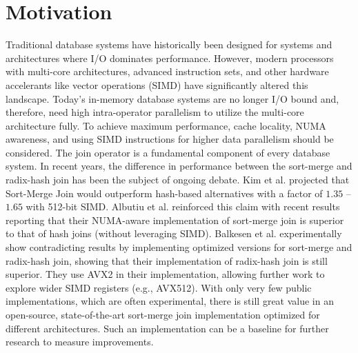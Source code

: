 \section{Motivation}
\label{sec:motivation}

Traditional database systems have historically been designed for systems and architectures where
I/O dominates performance. However, modern processors with multi-core architectures, advanced 
instruction sets, and other hardware accelerants like vector operations (SIMD) have significantly 
altered this landscape. Today's in-memory database systems are no longer I/O bound and, therefore,
need high intra-operator parallelism to utilize the multi-core architecture fully. To achieve
maximum performance, cache locality, NUMA awareness, and using SIMD instructions for higher data
parallelism should be considered.
The join operator is a fundamental component of every database system.
In recent years, the difference in performance between the sort-merge and radix-hash join has been
the subject of ongoing debate. Kim et al. \cite{10.14778/1687553.1687564} projected that Sort-Merge Join would outperform hash-based
alternatives with a factor of $1.35$ – $1.65$ with 512-bit SIMD. Albutiu et al. \cite{MPSM} reinforced this claim with recent results reporting that
their NUMA-aware implementation of sort-merge join is superior to that of hash joins (without
leveraging SIMD). Balkesen et al. \cite{Balkesen} experimentally show contradicting results by implementing 
optimized versions for sort-merge and radix-hash join, showing that their implementation of
radix-hash join is still superior. They use AVX2 in their implementation, allowing further
work to explore wider SIMD registers (e.g., AVX512). With only very few public implementations,
which are often experimental, there is still great value in an open-source, state-of-the-art 
sort-merge join implementation optimized for different architectures. Such an implementation can
be a baseline for further research to measure improvements.


